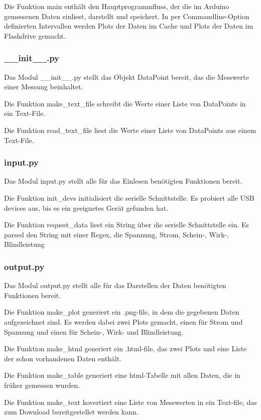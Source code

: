 \documentclass{article}
\begin{document}
Die Funktion main enthält den Hauptprogrammfluss, der die im Arduino gemessenen Daten einliest, darstellt und speichert.
In per Commandline-Option definierten Intervallen werden Plots der Daten im Cache und Plots der Daten im Flashdrive gemacht.

\subsubsection{\_\_init\_\_.py}
Das Modul \_\_init\_\_.py stellt das Objekt DataPoint bereit, das die Messwerte einer Messung beinhaltet.

Die Funktion make\_text\_file schreibt die Werte einer Liste von DataPoints in ein Text-File.

Die Funktion read\_text\_file liest die Werte einer Liste von DataPoints aus einem Text-File.

\subsubsection{input.py}
Das Modul input.py stellt alle für das Einlesen benötigten Funktionen bereit.

Die Funktion init\_devs initialisiert die serielle Schnittstelle.
Es probiert alle USB devices aus, bis es ein geeignetes Gerät gefunden hat.

Die Funktion request\_data liest ein String über die serielle Schnittstelle ein.
Es parsed den String mit einer Regex, die Spannung, Strom, Schein-, Wirk-, Blindleistung 

\subsubsection{output.py}
Das Modul output.py stellt alle für das Darstellen der Daten benötigten Funktionen bereit.

Die Funktion make\_plot generiert ein .png-file, in dem die gegebenen Daten aufgezeichnet sind.
Es werden dabei zwei Plots gemacht, einen für Strom und Spannung und einen für Schein-, Wirk- und Blindleistung.

Die Funktion make\_html generiert ein .html-file, das zwei Plots und eine Liste der schon vorhandenen Daten enthält.

Die Funktion make\_table generiert eine html-Tabelle mit allen Daten, die in früher gemessen wurden.

Die Funktion make\_text kovertiert eine Liste von Messwerten in ein Text-file, das zum Download bereitgestellet werden kann.
\end{document}
